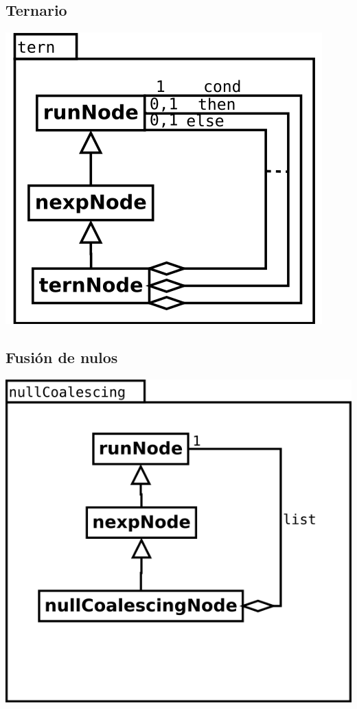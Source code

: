 \subsection {Ternario} 
\begin{center}
\includegraphics[scale=0.4]{tern.png} \\
\end{center}

\subsection {Fusión de nulos} 
\begin{center}
\includegraphics[scale=0.4]{nullCoalescing.png} \\
\end{center}

